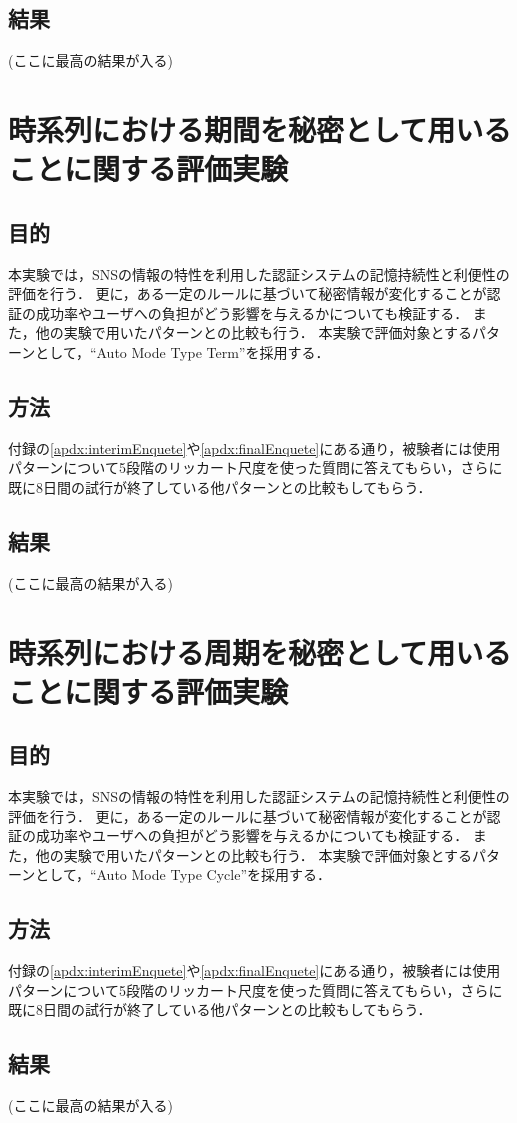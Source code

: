 \subsection{結果}
(ここに最高の結果が入る)

\section{時系列における期間を秘密として用いることに関する評価実験}\label{sec:vsTerm}
\subsection{目的}
本実験では，SNSの情報の特性を利用した認証システムの記憶持続性と利便性の評価を行う．
更に，ある一定のルールに基づいて秘密情報が変化することが認証の成功率やユーザへの負担がどう影響を与えるかについても検証する．
また，他の実験で用いたパターンとの比較も行う．
本実験で評価対象とするパターンとして，``Auto Mode Type Term''を採用する．

\subsection{方法}
付録の\ref{apdx:interimEnquete}や\ref{apdx:finalEnquete}にある通り，被験者には使用パターンについて5段階のリッカート尺度を使った質問に答えてもらい，さらに既に8日間の試行が終了している他パターンとの比較もしてもらう．

\subsection{結果}
(ここに最高の結果が入る)

\section{時系列における周期を秘密として用いることに関する評価実験}\label{sec:vsCycle}
\subsection{目的}
本実験では，SNSの情報の特性を利用した認証システムの記憶持続性と利便性の評価を行う．
更に，ある一定のルールに基づいて秘密情報が変化することが認証の成功率やユーザへの負担がどう影響を与えるかについても検証する．
また，他の実験で用いたパターンとの比較も行う．
本実験で評価対象とするパターンとして，``Auto Mode Type Cycle''を採用する．

\subsection{方法}
付録の\ref{apdx:interimEnquete}や\ref{apdx:finalEnquete}にある通り，被験者には使用パターンについて5段階のリッカート尺度を使った質問に答えてもらい，さらに既に8日間の試行が終了している他パターンとの比較もしてもらう．

\subsection{結果}
(ここに最高の結果が入る)

\newpage

